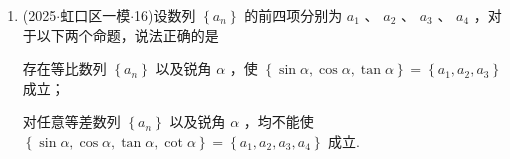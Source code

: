 \begin{enumerate}
    $p$ : 存在常数 $m$ ,使得曲线 $\Gamma$ 为单轨道曲线; $q$ : 存在常数 $m$ ,使得曲线 $\Gamma$ 为双轨道曲线.

    下列判断正确的是 
    \begin{jieda}
        记 $f\left( {x,y}\right)  = \sqrt{{\left( x + 1\right) }^{2} + {y}^{2}} \cdot  \sqrt{{\left( x - 1\right) }^{2} + {y}^{2}} - m$ , 易得 $f\left( {-x,y}\right)  = f\left( {x, - y}\right)  = f\left( {-x, - y}\right)  = f\left( {x,y}\right)  = 0$ , 因此曲线 $f\left( {x,y}\right)  = 0$ 关于 $x$ 轴、 $y$ 轴成轴对称,关于原点成中心对称,从几何上讲,曲线 $\Gamma$ 是到两定点 $\left( {1,0}\right)$ 和 $\left( {-1,0}\right)$ 的距离乘积为 $m$ 的点的轨迹,由 $f\left( {x,y}\right)  = 0$ 可得 $y =  \pm  \sqrt{\sqrt{4{x}^{2} + {m}^{2}} - {x}^{2} - 1}$ ,因此它在 $x$ 轴上方和下方分别是两个函数的图像,这两个函数图像在 $x$ 轴上有公共点 (方程 $y = 0$ 的解相同),由 $\sqrt{4{x}^{2} + {m}^{2}} - {x}^{2} - 1 \geq  0$ 得 $1 - m \leq  {x}^{2} \leq  1 + m,0 < m < 1$ 时, $- \sqrt{1 + m} \leq  x \leq   - \sqrt{1 - m}$ 或 $\sqrt{1 - m} \leq  x \leq  \sqrt{1 + m}$ ,所以曲线 $\Gamma$ 与 $y$ 轴无公共点,曲线 $\Gamma$ 是在 $y$ 轴两侧的两个曲线构成,是双轨道曲线; 当 $m > 1$ 时, $- \sqrt{1 + m} \leq  x \leq  \sqrt{1 + m}$ ,结合对称性知,曲线 $\Gamma$ 是一个封闭曲线,是单轨道曲线 (实际上上述过程中只要对 $m$ 取一个特定值讨论即可),命题 $p,q$ 均正确.
        
        \ps 卡西尼卵形线.
    \end{jieda}

    \item (2025$\cdot$虹口区一模$\cdot$16)设数列 $\left\{  {a}_{n}\right\}$ 的前四项分别为 ${a}_{1}$ 、 ${a}_{2}$ 、 ${a}_{3}$ 、 ${a}_{4}$ ，对于以下两个命题，说法正确的是 

      存在等比数列 $\left\{  {a}_{n}\right\}$ 以及锐角 $\alpha$ ，使 $\left\{  {\sin \alpha ,\cos \alpha ,\tan \alpha }\right\}   = \left\{  {{a}_{1},{a}_{2},{a}_{3}}\right\}$ 成立；

      对任意等差数列 $\left\{  {a}_{n}\right\}$ 以及锐角 $\alpha$ ，均不能使 $\left\{  {\sin \alpha ,\cos \alpha ,\tan \alpha ,\cot \alpha }\right\}   = \left\{  {{a}_{1},{a}_{2},{a}_{3},{a}_{4}}\right\}$ 成立.
    


\end{enumerate}
